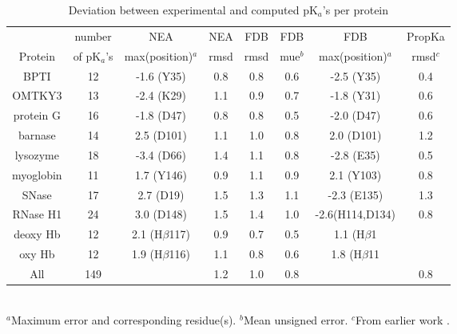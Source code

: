\documentclass[a4paper,12pt]{article}
\newcommand{\pk}{pK$_a$}
\begin{document}
\begin{table}[h]
\caption{Deviation between experimental and computed \pk's per protein} \label{tab:perrors}
\begin{center} \small
\begin{tabular}{cccccccc} \hline
          & number   &  NEA                &  NEA   &  FDB    & FDB & FDB              & PropKa   \\
Protein   & of \pk's & max(position)$^a$   & rmsd   & rmsd    & mue$^b$ & max(position)$^a$ & rmsd$^c$ \\ \hline
BPTI	  & 12	     &  -1.6  (Y35) 	   &  0.8   &   0.8   & 0.6 &  -2.5 (Y35) 	  & 0.4 \\
OMTKY3    & 13	     &  -2.4  (K29)	   &  1.1   &   0.9   & 0.7 &  -1.8 (Y31) 	  & 0.6 \\
protein G & 16	     &  -1.8  (D47) 	   &  0.8   &   0.8   & 0.5 &  -2.0 (D47) 	  & 0.6 \\
barnase   & 14	     &   2.5  (D101) 	   &  1.1   &   1.0   & 0.8 &   2.0 (D101)	  & 1.2 \\
lysozyme  & 18	     &  -3.4  (D66) 	   &  1.4   &   1.1   & 0.8 &  -2.8 (E35) 	  & 0.5 \\
myoglobin & 11	     &   1.7  (Y146) 	   &  0.9   &   1.1   & 0.9 &   2.1 (Y103)	  & 0.8 \\
SNase     & 17	     &   2.7  (D19)        &  1.5   &   1.3   & 1.1 &  -2.3 (E135)      & 1.3 \\
RNase H1  & 24	     &   3.0  (D148)       &  1.5   &   1.4   & 1.0 &  -2.6(H114,D134)  & 0.8 \\
deoxy Hb  & 12	     &   2.1 (H$\beta$117) &  0.9   &   0.7   & 0.5 &   1.1 (H$\beta$1  &     \\
oxy Hb    & 12	     &   1.9 (H$\beta$116) &  1.1   &   0.8   & 0.6 &   1.8 (H$\beta$11 &     \\ \hline 
All	  & 149      &	                   &  1.2   &   1.0   & 0.8 &                   & 0.8 \\ \hline
\end{tabular}                                                                                   	
\\ {\footnotesize \noindent $^a$Maximum error and corresponding residue(s). $^b$Mean unsigned error.
  $^c$From earlier work \cite{Polydorides13}.}
\end{center}
\end{table}
\end{document}
